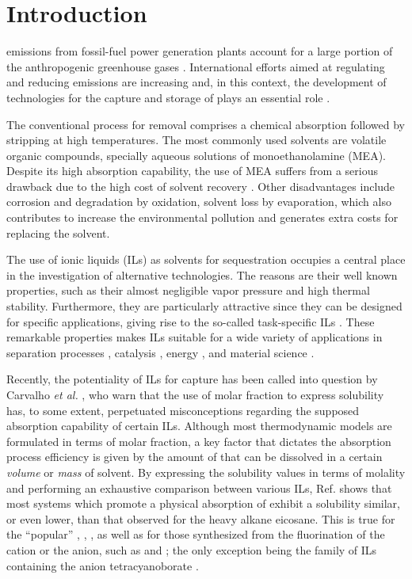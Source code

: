 \documentclass[3p,twocolumn]{elsarticle}
\begin{document}
\linenumbers

\section{Introduction}
 emissions from fossil-fuel power generation plants account for a large portion of the anthropogenic greenhouse gases \cite{totalenergy}.
International efforts aimed at regulating and reducing  emissions are increasing \cite{Tong_2018} and, in this context, the development of technologies for the capture and storage of  plays an essential role \cite{Markewitz_2014}. 

The conventional process for  removal comprises a chemical absorption followed by stripping at high temperatures.
The most commonly used solvents are volatile organic compounds, specially aqueous solutions of monoethanolamine (MEA).
Despite its high absorption capability, the use of MEA suffers from a serious drawback due to the high cost of solvent recovery \cite{Merkel_2010}.
Other disadvantages include corrosion and degradation by oxidation, solvent loss by evaporation, which also contributes to increase the environmental pollution and generates extra costs for replacing the solvent.

The use of ionic liquids (ILs) as solvents for  sequestration occupies a central place in the investigation of alternative technologies.
The reasons are their well known properties, such as their almost negligible vapor pressure and high thermal stability.
Furthermore, they are particularly attractive since they can be designed for specific applications, giving rise to the so-called task-specific ILs \cite{Seo_2014}.
These remarkable properties makes ILs suitable for a wide variety of applications in separation processes \cite{Han_2010,Werner_2010}, catalysis \cite{P_rvulescu_2007}, energy \cite{MacFarlane_2014}, and material science \cite{Mecerreyes_2011,Tom_2015,Dupont_2010,Leones_2017,Kinik_2017}.

Recently, the potentiality of ILs for  capture has been called into question by Carvalho \textit{et al.} \cite{Carvalho_2016}, who warn that the use of molar fraction to express solubility has, to some extent, perpetuated misconceptions regarding the supposed absorption capability of certain ILs.
Although most thermodynamic models are formulated in terms of molar fraction, a key factor that dictates the absorption process efficiency is given by the amount of  that can be dissolved in a certain \textit{volume} or \textit{mass} of solvent.
By expressing the solubility values in terms of molality and performing an exhaustive comparison between various ILs, Ref. \cite{Carvalho_2016} shows that most systems which promote a physical absorption of  exhibit a solubility similar, or even lower, than that observed for the heavy alkane eicosane.
This is true for the ``popular'' \ce{[bmim][NTf_2]}, \ce{[bmim][PF_6]}, \ce{[bmim][BF_4]}, as well as for those synthesized from the fluorination of the cation or the anion, such as \ce{[(C_2H_2F_2)mim][NTf_2]} and \ce{[hmim][pFAP]}; the only exception being the family of ILs containing the anion tetracyanoborate \ce{[B(CN)_4]^-}.
\end{document}
